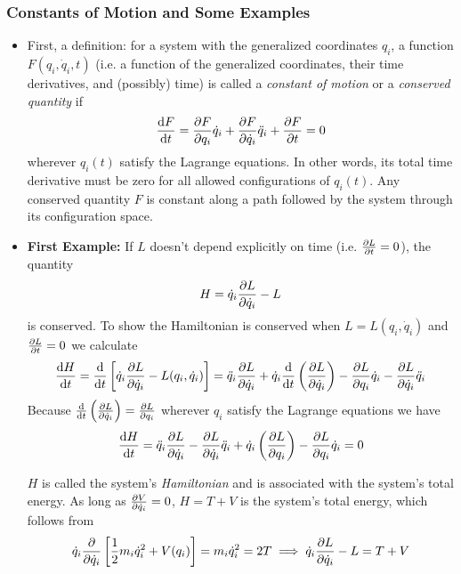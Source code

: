 \documentclass[11pt, a4paper]{article}
\begin{document}
\subsubsection{Constants of Motion and Some Examples}
\begin{itemize}
	\item First, a definition: for a system with the generalized coordinates $ q_i $, a function $ F(q_i, \dot q_i, t) $ (i.e. a function of the generalized coordinates, their time derivatives, and (possibly) time) is called a \textit{constant of motion} or a \textit{conserved quantity} if
	\begin{equation*}
		\dv{F}{t} = \pdv{F}{q_i}\dot{q}_i + \pdv{F}{\dot{q}_i}\ddot{q}_i + \pdv{F}{t} = 0
	\end{equation*}
	wherever $ q_{i}(t) $ satisfy the Lagrange equations. In other words, its total time derivative must be zero for all allowed configurations of $ q_{i}(t) $. Any conserved quantity $ F $ is constant along a path followed by the system through its configuration space.
	
	\item \textbf{First Example:} If $ L $ doesn't depend explicitly on time (i.e. $ \pdv{L}{t} = 0 $), the quantity 
	\begin{equation*}
		H = \dot{q}_{i}\pdv{L}{\dot{q}_{i}} - L
	\end{equation*}
	is conserved. To show the Hamiltonian is conserved when $ L = L(q_i, \dot{q}_i) $  and  $\pdv{L}{t} = 0 $ we calculate
	\begin{equation*}
		\dv{H}{t} = \dv{}{t}\left[\dot{q}_i \pdv{L}{\dot{q}_i} - L(q_i, \dot{q}_i) \right] = \ddot{q}_{i} \pdv{L}{\dot{q}_i}  + \dot{q}_i\dv{}{t}\left( \pdv{L}{\dot{q}_i}\right) - \pdv{L}{q_{i}}\dot{q}_{i} - \pdv{L}{\dot{q}_{i}}\ddot{q}_{i}
	\end{equation*}
	Because $ \dv{}{t}\left( \pdv{L}{\dot{q}_i}\right) = \pdv{L}{q_i} $ wherever $ q_{i} $ satisfy the Lagrange equations we have
	\begin{equation*}
		\dv{H}{t} = \ddot{q}_{i} \pdv{L}{\dot{q}_i} - \pdv{L}{\dot{q}_{i}}\ddot{q}_{i} + \dot{q}_i\left(\pdv{L}{q_{i}}\right) - \pdv{L}{q_{i}}\dot{q}_{i} = 0
	\end{equation*}	
	
	$ H $ is called the system's \textit{Hamiltonian} and is associated with the system's total energy. As long as $ \pdv{V}{\dot{q}_{i}} = 0$, $ H = T + V $ is the system's total energy, which follows from
	\begin{equation*}
		\dot{q}_{i} \pdv{}{\dot{q}_{i}} \left[\frac{1}{2}m_{i} \dot{q}_{i}^{2} + V(q_{i}) \right] = m_{i}\dot{q}_{i}^{2} = 2T \implies  \dot{q}_{i}\pdv{L}{\dot{q}_{i}} - L = T + V
	\end{equation*}
	

\end{itemize}
\end{document}
